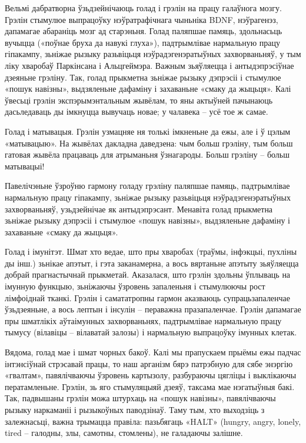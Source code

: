 Вельмі дабратворна ўзьдзейнічаюць голад і грэлін на працу галаўнога мозгу. Грэлін стымулюе выпрацоўку нэўратрафічнага чыньніка BDNF, нэўрагенэз, дапамагае абараніць мозг ад старэньня. Голад паляпшае памяць, здольнасьць вучыцца («поўнае бруха да навукі глуха»), падтрымлівае нармальную працу гіпакампу, зьніжае рызыку разьвіцьця нэўрадэгенэратыўных захворваньняў, у тым ліку хваробаў Паркінсана і Альцгеймэра. Важным зьяўляецца і антыдэпрэсіўнае дзеяньне грэліну. Так, голад прыкметна зьніжае рызыку дэпрэсіі і стымулюе «пошук навізны», выдзяленьне дафаміну і захаваньне «смаку да жыцьця». Калі ўвесьці грэлін экспэрымэнтальным жывёлам, то яны актыўней пачынаюць дасьледаваць ды імкнуцца вывучаць новае; у чалавека – усё тое ж самае.

Голад і матывацыя.
Грэлін узмацняе ня толькі імкненьне да ежы, але і ў цэлым «матывацыю». На жывёлах дакладна даведзена: чым больш грэліну, тым больш гатовая жывёла працаваць для атрыманьня ўзнагароды. Больш грэліну – больш матывацыі!

Павелічэньне ўзроўню гармону голаду грэліну паляпшае памяць, падтрымлівае нармальную працу гіпакампу, зьніжае рызыку разьвіцьця нэўрадэгенэратыўных захворваньняў, узьдзейнічае як антыдэпрэсант. Менавіта голад прыкметна зьніжае рызыку дэпрэсіі і стымулюе «пошук навізны», выдзяленьне дафаміну і захаваньне «смаку да жыцьця».

Голад і імунітэт.
Шмат хто ведае, што пры хваробах (траўмы, інфэкцыі, пухліны ды інш.) зьнікае апэтыт, і гэта заканамерна, а вось вяртаньне апэтыту зьяўляецца добрай прагнастычнай прыкметай. Аказалася, што грэлін здольны ўплываць на імунную функцыю, зьніжаючы ўзровень запаленьня і стымулюючы рост лімфоіднай тканкі. Грэлін і самататропны гармон аказваюць супрацьзапаленчае ўзьдзеяньне, а вось лептын і інсулін – пераважна празапаленчае. Грэлін дапамагае пры шматлікіх аўтаімунных захворваньнях, падтрымлівае нармальную працу тымусу (вілавіцы – вілаватай залозы) і нармальную выпрацоўку імунных клетак.

Вядома, голад мае і шмат чорных бакоў. Калі мы прапускаем прыёмы ежы падчас інтэнсіўнай стрэсавай працы, то наш арганізм бярэ патрэбную для сябе энэргію «гвалтам», павялічваючы ўзровень картызолу, разбураючы цягліцы і выклікаючы ператамленьне. Грэлін, зь яго стымуляцыяй дзеяў, таксама мае нэгатыўныя бакі. Так, падвышаны грэлін можа штурхаць на «пошук навізны», павялічваючы рызыку наркаманіі і рызыкоўных паводзінаў. Таму тым, хто выходзіць з залежнасьці, важна трымацца правіла: пазьбягаць «HALT» (hungry, angry, lonely, tired – галодны, злы, самотны, стомлены), не галадаючы залішне.

